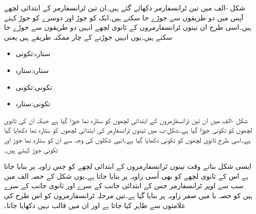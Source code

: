 شکل -الف میں تین ٹرانسفارمر دکھائے گئے ہیں۔ان تین ٹرانسفارمر کے ابتدائی لچھے آپس میں دو طریقوں سے جوڑے جا سکتے ہیں۔ایک کو  جوڑ   اور دوسرے کو  جوڑ     کہتے ہیں۔اسی طرح ان تینوں ٹرانسفارمروں کے ثانوی  لچھے انہیں دو طریقوں سے جوڑے جا سکتے ہیں۔یوں انہیں جوڑنے کے چار ممکنہ طریقے ہیں یعنی
\begin{itemize}
\item
ستارہ:تکونی  \quad {}
\item
ستارہ:ستارہ \quad  {}
\item
تکونی:تکونی \quad  {}
\item
تکونی:ستارہ  \quad  {}
\end{itemize}

شکل -الف میں ان تین ٹرانسفارمروں کے ابتدائی لچھوں کو ستارہ نما جوڑا گیا ہے جبکہ ان کی ثانوی لچھوں کو تکونی جوڑا گیا ہے۔شکل-ب میں تینوں ٹرانسفارمر کی ابتدائی لچھوں کو  ستارہ نما  دکھایا گیا ہے۔اسی طرح ثانوی لچھوں کو تکونی  دکھایا گیا ہے۔انہی شکلوں کی وجہ سے ان کو ستارہ نما جوڑ اور تکونی جوڑ کہتے ہیں۔

ایسی شکل بناتے وقت تینوں ٹرانسفارمروں کے ابتدائی لچھے کو جس زاویہ پر بنایا جاتا ہے اس کے ثانوی لچھے کو بھی اُسی زاویہ پر بنایا جاتا ہے۔یوں شکل کے حصہ الف میں سب سے اوپر ٹرانسفارمر جس کے ابتدائی جانب کے  سرے  اور ثانوی جانب  کے سرے  ہیں کو حصہ با میں صفر زاویہ پر بنایا گیا ہے۔تین  مرحلہ ٹرانسفارمروں کو اس طرح کی علامتوں سے ظاہر کیا جاتا ہے اور ان میں قالب نہیں دکھایا جاتا۔

